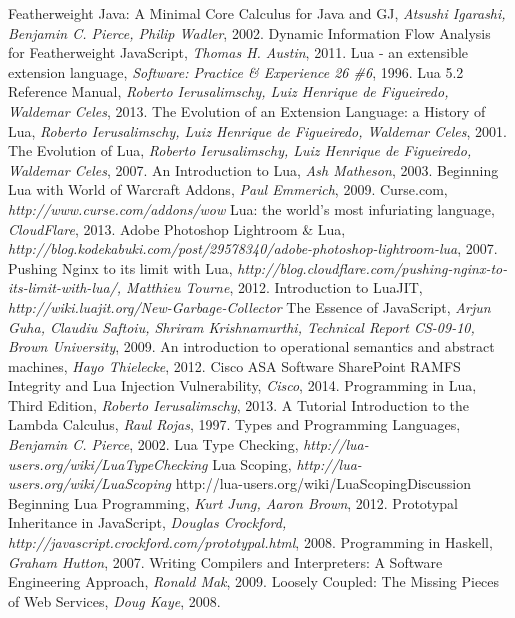 \begin{thebibliography}{10}

 Featherweight Java: A Minimal Core Calculus for Java and GJ, {\it Atsushi Igarashi, Benjamin C. Pierce, Philip Wadler}, 2002.
 Dynamic Information Flow Analysis for Featherweight JavaScript, {\it Thomas H. Austin}, 2011.
 Lua - an extensible extension language, {\it  Software: Practice \& Experience 26 \#6}, 1996.
 Lua 5.2 Reference Manual, {\it Roberto Ierusalimschy, Luiz Henrique de Figueiredo, Waldemar Celes}, 2013.
 The Evolution of an Extension Language: a History of Lua, {\it  Roberto Ierusalimschy, Luiz Henrique de Figueiredo, Waldemar Celes}, 2001.
 The Evolution of Lua, {\it Roberto Ierusalimschy, Luiz Henrique de Figueiredo, Waldemar Celes}, 2007.
 An Introduction to Lua, {\it  Ash Matheson}, 2003.
 Beginning Lua with World of Warcraft Addons, {\it Paul Emmerich}, 2009.
 Curse.com, {\it http://www.curse.com/addons/wow}
 Lua: the world's most infuriating language, {\it CloudFlare}, 2013.
 Adobe Photoshop Lightroom \& Lua, {\it http://blog.kodekabuki.com/post/29578340/adobe-photoshop-lightroom-lua}, 2007.
 Pushing Nginx to its limit with Lua,  {\it http://blog.cloudflare.com/pushing-nginx-to-its-limit-with-lua/, Matthieu Tourne}, 2012.
 Introduction to LuaJIT, {\it http://wiki.luajit.org/New-Garbage-Collector}
 The Essence of JavaScript, {\it Arjun Guha, Claudiu Saftoiu, Shriram Krishnamurthi, Technical Report CS-09-10, Brown University}, 2009.
 An introduction to operational semantics and abstract machines, {\it Hayo Thielecke}, 2012.
 Cisco ASA Software SharePoint RAMFS Integrity and Lua Injection Vulnerability, {\it Cisco}, 2014.
 Programming in Lua, Third Edition, {\it  Roberto Ierusalimschy}, 2013.
 A Tutorial Introduction to the Lambda Calculus, {\it Raul Rojas}, 1997.
 Types and Programming Languages, {\it Benjamin C. Pierce}, 2002.
 Lua Type Checking, {\it http://lua-users.org/wiki/LuaTypeChecking}
 Lua Scoping, {\it http://lua-users.org/wiki/LuaScoping}
 http://lua-users.org/wiki/LuaScopingDiscussion
 Beginning Lua Programming, {\it Kurt Jung, Aaron Brown}, 2012.
 Prototypal Inheritance in JavaScript, {\it Douglas Crockford, http://javascript.crockford.com/prototypal.html}, 2008.
 Programming in Haskell, {\it Graham Hutton}, 2007.
 Writing Compilers and Interpreters: A Software Engineering Approach, {\it Ronald Mak}, 2009.
 Loosely Coupled: The Missing Pieces of Web Services, {\it Doug Kaye}, 2008.
\\

\end{thebibliography}
